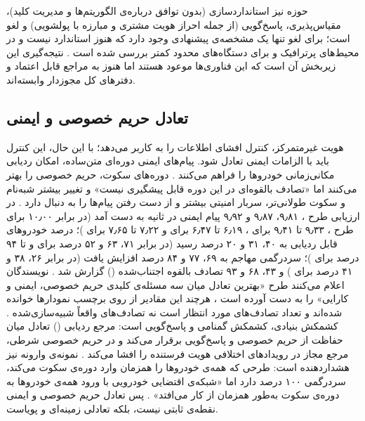 حوزه نیز استانداردسازی (بدون توافق درباره‌ی الگوریتم‌ها و مدیریت کلید)، مقیاس‌پذیری، پاسخ‌گویی (از جمله احراز هویت مشتری و مبارزه با پولشویی) و لغو است؛ برای لغو تنها یک مشخصه‌ی پیشنهادی وجود دارد که هنوز استاندارد  نیست و در محیط‌های پرترافیک و برای دستگاه‌های محدود کمتر بررسی شده است \cite{mazzocca2025survey}. نتیجه‌گیری این زیربخش آن است که این فناوری‌ها موعود هستند اما هنوز به مراجع قابل اعتماد و دفترهای کل مجوزدار وابسته‌اند.

\subsection{تعادل حریم خصوصی و ایمنی}

هویت غیرمتمرکز، کنترل افشای اطلاعات را به کاربر می‌دهد؛ با این حال، این کنترل باید با الزامات ایمنی تعادل شود. پیام‌های ایمنی دوره‌ای متن‌ساده، امکان ردیابی مکانی‌زمانی خودروها را فراهم می‌کنند \cite{al-aniPrivacySafetyImprovement2023}. دوره‌های سکوت، حریم خصوصی را بهتر می‌کنند اما «تصادف بالقوه‌ای در این دوره قابل پیشگیری نیست» \cite{al-aniPrivacySafetyImprovement2023} و تغییر بیشتر شبه‌نام و سکوت طولانی‌تر، سربار امنیتی بیشتر و از دست رفتن پیام‌ها را به دنبال دارد \cite{al-aniPrivacySafetyImprovement2023}. در ارزیابی طرح ، ۹٫۸۱، ۹٫۸۷ و ۹٫۹۲ پیام ایمنی در ثانیه به دست آمد (در برابر ۱۰٫۰۰ برای طرح ، ۹٫۳۳ تا ۹٫۴۱ برای ، ۶٫۱۹ تا ۶٫۴۷ برای  و ۷٫۲۲ تا ۷٫۶۵ برای )؛ درصد خودروهای قابل ردیابی به ۴۰، ۳۱ و ۲۰ درصد رسید (در برابر ۷۱، ۶۳ و ۵۲ درصد برای  و تا ۹۴ درصد برای )؛ سردرگمی مهاجم به ۶۹، ۷۷ و ۸۴ درصد افزایش یافت (در برابر ۲۶، ۳۸ و ۴۱ درصد برای ) و ۴۳، ۶۸ و ۹۳ تصادف بالقوه اجتناب‌شده () گزارش شد \cite{al-aniPrivacySafetyImprovement2023}. نویسندگان اعلام می‌کنند طرح  «بهترین تعادل میان سه مسئله‌ی کلیدی حریم خصوصی، ایمنی و کارایی» را به دست آورده است \cite{al-aniPrivacySafetyImprovement2023}، هرچند این مقادیر از روی برچسب نمودارها خوانده شده‌اند و  تعداد تصادف‌های مورد انتظار است نه تصادف‌های واقعاً شبیه‌سازی‌شده \cite{al-aniPrivacySafetyImprovement2023}. کشمکش بنیادی، کشمکش گمنامی و پاسخ‌گویی است: مرجع ردیابی () تعادل میان حفاظت از حریم خصوصی و پاسخ‌گویی برقرار می‌کند \cite{rahmawatiagustinaSystematicLiteratureReview2025} و در حریم خصوصی شرطی، مرجع مجاز در رویدادهای اختلافی هویت فرستنده را افشا می‌کند \cite{linGSISSecurePrivacyPreserving2007, luPseudonymChangingSocial2012}. نمونه‌ی وارونه نیز هشداردهنده است: طرحی که همه‌ی خودروها را همزمان وارد دوره‌ی سکوت می‌کند، سردرگمی ۱۰۰ درصد دارد اما «شبکه‌ی اقتضایی خودرویی با ورود همه‌ی خودروها به دوره‌ی سکوت به‌طور همزمان از کار می‌افتد» \cite{al-aniPrivacySafetyImprovement2023}. پس تعادل حریم خصوصی و ایمنی نقطه‌ی ثابتی نیست، بلکه تعادلی زمینه‌ای و پویاست.

